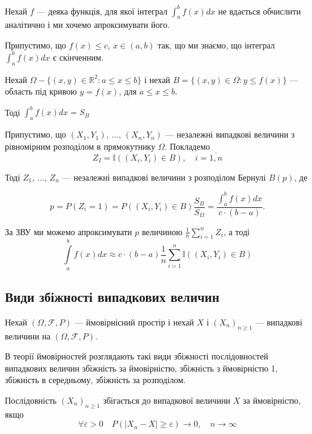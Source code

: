 \begin{example}
    Нехай $f$ --- деяка функція, для якої інтеграл
    $\int_{a}^{b} f(x) dx$
    не вдається обчислити аналітично і ми хочемо
    апроксимувати його.

    Припустимо, що $f(x) \leqslant c$, $x \in (a, b)$
    так, що ми знаємо, що 
    інтеграл $\int_{a}^{b} f(x) dx$ є скінченним.

    Нехай
    $\Omega - \{(x, y) \in \mathbb{R}^2: a \leqslant x \leqslant b\}$
    і нехай
    $B = \{(x, y) \in \Omega: y \leqslant f(x)\}$
    --- область під кривою $y = f(x)$, для $a \leqslant x \leqslant b$.

    Тоді
    $\int_{a}^{b} f(x) dx = S_B$

    \beautifulImage

    Припустимо, що $(X_1, Y_1)$, ..., $(X_n, Y_n)$
    --- незалежні випадкові величини
    з рівномірним розподілом в прямокутнику $\Omega$.
    Покладемо
    $$Z_I = \mathbb{I}((X_i, Y_i) \in B), \quad i = \overline{1, n}$$
    
    Тоді $Z_1$, ..., $Z_n$ --- незалежні випадкові величини з 
    розподілом Бернулі $B(p)$, де 
    
    $$p = P(Z_i = 1) = P((X_i, Y_i) \in B) \dfrac{S_B}{S_{\Omega}} = \dfrac{\int_{a}^{b} f(x) dx}{c \cdot (b-a)}.$$
\end{example}

    За ЗВУ ми можемо апроксимувати $p$ величиною
    $\frac{1}{n} \sum\limits_{i = 1}^n Z_i$, а тоді
    \begin{equation}
        \int\limits_{a}^{b} f(x) dx 
        \approx c \cdot (b-a) \frac{1}{n} \sum\limits_{i = 1}^n \mathbb{I}((X_i, Y_i) \in B)
    \end{equation}

\subsection{Види збіжності випадкових величин}

Нехай $(\Omega, \mathcal{F}, P)$ --- ймовірнісний
простір і нехай $X$ і $(X_n)_{n \geqslant 1}$ --- випадкові
величини на $(\Omega, \mathcal{F}, P)$.

В теорії ймовірностей розглядають такі види
збіжності послідовностей випадкових величин
збіжність за ймовірністю, збіжність з ймовірністю
1, збіжність в середньому, збіжність
за розподілом.

\begin{definition}
    Послідовність $(X_n)_{n \geqslant 1}$ збігається до
    випадкової величини $X$ за ймовірністю, якщо
    \begin{equation}
        \label{converge_by_probability}
        \forall \varepsilon > 0 \quad P(|X_n - X| \geqslant \varepsilon) \rightarrow 0, \quad n \rightarrow \infty
    \end{equation}
\end{definition}


